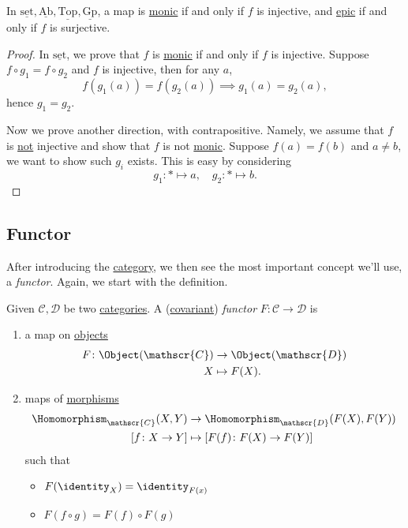 \begin{lemma}
	In \(\underline{\mathrm{set}}, \underline{\mathrm{Ab}}, \underline{\mathrm{Top}}, \underline{\mathrm{Gp}}\), a map is \hyperref[def:monic]{monic} if and only
	if \(f\) is injective, and \hyperref[def:epic]{epic} if and only if \(f\) is surjective.
\end{lemma}
\begin{proof}
	In \(\underline{\mathrm{set}}\), we prove that \(f\) is \hyperref[def:monic]{monic} if and only if \(f\) is injective. Suppose
	\(f\circ g_1 = f\circ g_2\) and \(f\) is injective, then for any \(a\),
	\[
		f(g_1(a)) = f(g_2(a))\implies g_1(a) = g_2(a),
	\]
	hence \(g_1 = g_2\).

	\par Now we prove another direction, with contrapositive. Namely, we assume that \(f\) is \underline{not} injective and show that
	\(f\) is not \hyperref[def:monic]{monic}. Suppose \(f(a) = f(b)\) and \(a\neq b\), we want to show such \(g_{i}\) exists. This is easy by considering
	\[
		g_1\colon \ast\mapsto a,\quad g_2\colon \ast\mapsto b.
	\]
\end{proof}

\subsection{Functor}
After introducing the \hyperref[def:category]{category}, we then see the most important concept we'll use, a \emph{functor}. Again, we start with the definition.
\begin{definition}[Functor]\label{def:functor}
	Given \(\mathscr{C} , \mathscr{D} \) be two \hyperref[def:category]{categories}. A (\underline{covariant}) \emph{functor} \(F\colon \mathscr{C} \to \mathscr{D}\)
	is
	\begin{enumerate}
		\item a map on \hyperref[def:object]{objects}
		      \[
			      \begin{split}
				      F\colon \Object(\mathscr{C} )&\to \Object(\mathscr{D} )\\
				      X&\mapsto F(X).
			      \end{split}
		      \]
		\item maps of \hyperref[def:morphism]{morphisms}
		      \[
			      \begin{split}
				      \Homomorphism_{\mathscr{C} }(X, Y)&\to \Homomorphism_{\mathscr{D} }(F(X), F(Y))\\
				      \left[f\colon X\to Y\right] &\mapsto \left[F(f)\colon F(X)\to F(Y)\right]
			      \end{split}
		      \]
		      such that
		      \begin{itemize}
			      \item \(F(\identity_{X} ) = \identity_{F(x)} \)
			      \item \(F(f\circ g) = F(f)\circ F(g)\)
		      \end{itemize}
	\end{enumerate}
\end{definition}